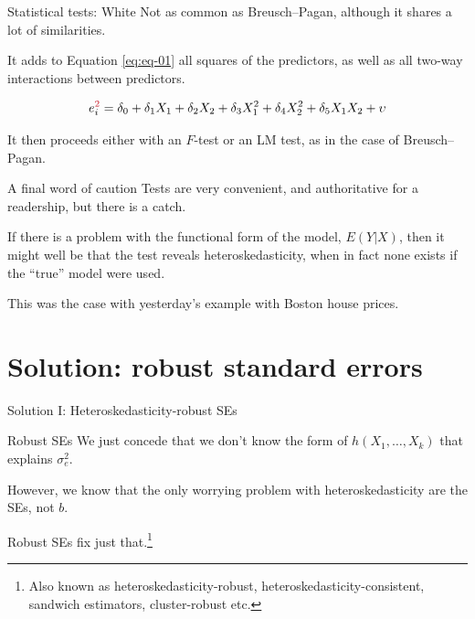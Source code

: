 \documentclass[12pt,english,pdf,xcolor=dvipsnames,aspectratio=169,handout]{beamer}\usepackage[]{graphicx}\usepackage[]{xcolor}
\begin{document}
\begin{frame}{Statistical tests: White}
  Not as common as Breusch--Pagan, although it shares a lot of similarities.\bigskip

  It adds to Equation \ref{eq:eq-01} all squares of the predictors, as well as all two-way interactions between predictors.\bigskip

  \begin{equation}
    \footnotesize
e_i^{\textcolor{title}{2}} = \delta_0 + \delta_1X_1 + \delta_2X_2 + \delta_3X_1^2 + \delta_4X_2^2 + \delta_5X_1X_2 + \upsilon
  \end{equation}

  It then proceeds either with an $F$-test or an LM test, as in the case of Breusch--Pagan.
  
\end{frame}


\begin{frame}{A final word of caution}
  Tests are very convenient, and authoritative for a readership, but there is a catch.\bigskip

  If there is a problem with the functional form of the model, $E(Y|X)$, then it might well be that the test reveals heteroskedasticity, when in fact none exists if the ``true'' model were used.\bigskip

  This was the case with yesterday's example with Boston house prices.
  
\end{frame}


\section{Solution: robust standard errors}

\begin{frame}
\begin{center}
    \Huge Solution I: Heteroskedasticity-robust SEs
\end{center}
\end{frame}


\begin{frame}{Robust SEs}
  We just concede that we don't know the form of $h(X_1, \dots, X_k)$ that explains $\sigma_e^2$.\bigskip

  However, we know that the only worrying problem with heteroskedasticity are the SEs, not $b$.\bigskip

  Robust SEs fix just that.\footnote{Also known as heteroskedasticity-robust, heteroskedasticity-consistent, sandwich estimators, cluster-robust etc.}

\end{frame}
\end{document}
